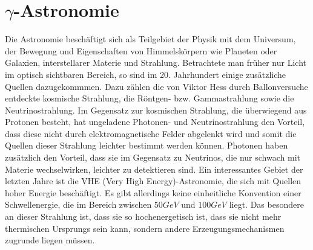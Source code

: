 \chapter{$\gamma$-Astronomie} 
\label{ch:gamma}
Die Astronomie beschäftigt sich als Teilgebiet der Physik mit dem Universum, der Bewegung und Eigenschaften von Himmelskörpern wie Planeten oder Galaxien, interstellarer Materie und Strahlung. Betrachtete man früher nur Licht im optisch sichtbaren Bereich, so sind im 20. Jahrhundert einige zusätzliche Quellen dazugekommmen. Dazu zählen die von Viktor Hess durch Ballonversuche entdeckte kosmische Strahlung, die Röntgen- bzw. Gammastrahlung sowie die Neutrinostrahlung. Im Gegensatz zur kosmischen Strahlung, die überwiegend aus Protonen besteht, hat ungeladene Photonen- und Neutrinostrahlung den Vorteil, dass diese nicht durch elektromagnetische Felder abgelenkt wird und somit die Quellen dieser Strahlung leichter bestimmt werden können. Photonen haben zusätzlich den Vorteil, dass sie im Gegensatz zu Neutrinos, die nur schwach mit Materie wechselwirken, leichter zu detektieren sind. Ein interessantes Gebiet der letzten Jahre ist die VHE (Very High Energy)-Astronomie, die sich mit Quellen hoher Energie beschäftigt. Es gibt allerdings keine einheitliche Konvention einer Schwellenergie, die im Bereich zwischen $50 \unit{GeV}$ \cite{TeVCat2} und $100 \unit{GeV}$ \cite{DesignConcept} liegt. Das besondere an dieser Strahlung ist, dass sie so hochenergetisch ist, dass sie nicht mehr thermischen Ursprungs sein kann, sondern andere Erzeugungsmechanismen zugrunde liegen müssen.

